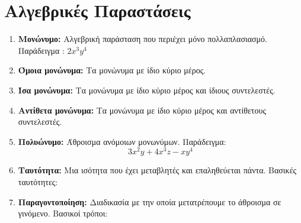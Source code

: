 \documentclass[twoside,nofonts,internet,shmeiwseis]{thewria}
\begin{document}
\section{Αλγεβρικές Παραστάσεις}
\begin{enumerate}
\item \textbf{Μονώνυμο:} Αλγεβρική παράσταση που περιέχει μόνο πολλαπλασιασμό. Παράδειγμα : $ 2x^3y^4 $
\item \textbf{Όμοια μονώνυμα:} Τα μονώνυμα με ίδιο κύριο μέρος.
\item \textbf{Ίσα μονώνυμα:} Τα μονώνυμα με ίδιο κύριο μέρος και ίδιους συντελεστές.
\item \textbf{Αντίθετα μονώνυμα:} Τα μονώνυμα με ίδιο κύριο μέρος και αντίθετους συντελεστές.
\item \textbf{Πολυώνυμο:} Άθροισμα ανόμοιων μονωνύμων. Παράδειγμα:
\[ 3x^2y+4x^3z-xy^4 \]
\item \textbf{Ταυτότητα:} Μια ισότητα που έχει μεταβλητές και επαληθεύεται πάντα. Βασικές ταυτότητες:
\item \textbf{Παραγοντοποίηση:} Διαδικασία με την οποία μετατρέπουμε το άθροισμα σε γινόμενο. Βασικοί τρόποι:

\end{enumerate}
\end{document}

